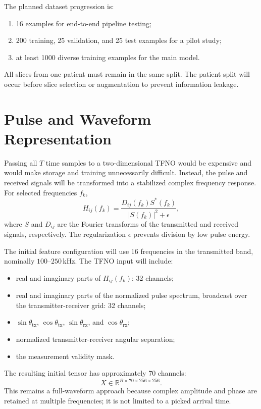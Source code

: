 \documentclass[11pt]{article}
\begin{document}
The planned dataset progression is:
\begin{enumerate}
  \item 16 examples for end-to-end pipeline testing;
  \item 200 training, 25 validation, and 25 test examples for a pilot study;
  \item at least 1000 diverse training examples for the main model.
\end{enumerate}

All slices from one patient must remain in the same split. The patient split
will occur before slice selection or augmentation to prevent information
leakage.

\section{Pulse and Waveform Representation}

Passing all $T$ time samples to a two-dimensional TFNO would be expensive and
would make storage and training unnecessarily difficult. Instead, the pulse
and received signals will be transformed into a stabilized complex frequency
response. For selected frequencies $f_k$,
\begin{equation}
  H_{ij}(f_k)=
  \frac{D_{ij}(f_k)S^*(f_k)}{|S(f_k)|^2+\epsilon},
\end{equation}
where $S$ and $D_{ij}$ are the Fourier transforms of the transmitted and
received signals, respectively. The regularization $\epsilon$ prevents
division by low pulse energy.

The initial feature configuration will use 16 frequencies in the transmitted
band, nominally $100$--$250\,\mathrm{kHz}$. The TFNO input will include:
\begin{itemize}
  \item real and imaginary parts of $H_{ij}(f_k)$: 32 channels;
  \item real and imaginary parts of the normalized pulse spectrum, broadcast
        over the transmitter-receiver grid: 32 channels;
  \item $\sin\theta_{\mathrm{tx}}$, $\cos\theta_{\mathrm{tx}}$,
        $\sin\theta_{\mathrm{rx}}$, and $\cos\theta_{\mathrm{rx}}$;
  \item normalized transmitter-receiver angular separation;
  \item the measurement validity mask.
\end{itemize}

The resulting initial tensor has approximately 70 channels:
\begin{equation}
  X\in\mathbb{R}^{B\times70\times256\times256}.
\end{equation}
This remains a full-waveform approach because complex amplitude and phase are
retained at multiple frequencies; it is not limited to a picked arrival time.
\end{document}
